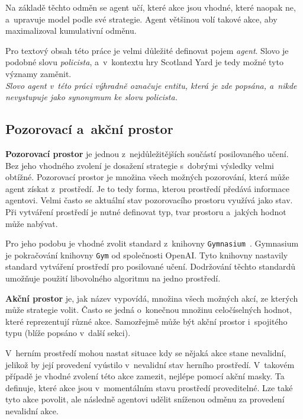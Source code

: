 Na základě těchto odměn se agent učí, které akce jsou vhodné, které naopak ne, a~upravuje model podle své strategie.
Agent většinou volí takové akce, aby maximalizoval kumulativní odměnu.

Pro textový obsah této práce je velmi důležité definovat pojem \emph{agent}.
Slovo je podobné slovu \emph{policista}, a~v~kontextu hry Scotland Yard je tedy možné tyto významy zaměnit.\\
\emph{Slovo agent v~této práci výhradně označuje entitu, která je zde popsána, a~nikde nevystupuje jako synonymum ke slovu policista.}

\subsection{Pozorovací a~akční prostor}
\label{subsec:prostory}

\textbf{Pozorovací prostor} je jednou z~nejdůležitějších součástí posilovaného učení.
Bez jeho vhodného zvolení je dosažení strategie s~dobrými výsledky velmi obtížné.
Pozorovací prostor je množina všech možných pozorování, která může agent získat z~prostředí.
Je to tedy forma, kterou prostředí předává informace agentovi.
Velmi často se aktuální stav pozorovacího prostoru využívá jako stav.
Při vytváření prostředí je nutné definovat typ, tvar prostoru a~jakých hodnot může nabývat.

Pro jeho podobu je vhodné zvolit standard z~knihovny \texttt{Gymnasium}~\cite{Gymnasium}.
Gymnasium je pokračování knihovny \texttt{Gym} od společnosti OpenAI\@.
Tyto knihovny nastavily standard vytváření prostředí pro posilované učení.
Dodržování těchto standardů umožňuje použití libovolného algoritmu na jedno prostředí.

\bigskip

\textbf{Akční prostor} je, jak název vypovídá, množina všech možných akcí, ze kterých může strategie volit.
Často se jedná o~konečnou množinu celočíselných hodnot, které reprezentují různé akce.
Samozřejmě může být akční prostor i~spojitého typu (blíže popsáno v~další sekci).

V~herním prostředí mohou nastat situace kdy se nějaká akce stane nevalidní, jelikož by její provedení vyústilo v~nevalidní stav herního prostředí.
V~takovém případě je vhodné zvolení této akce zamezit, nejlépe pomocí akční masky.
Ta definuje, které akce jsou v~momentálním stavu prostředí proveditelné.
Lze také tyto akce povolit, ale následně agentovi udělit sníženou odměnu za provedení nevalidní akce.

